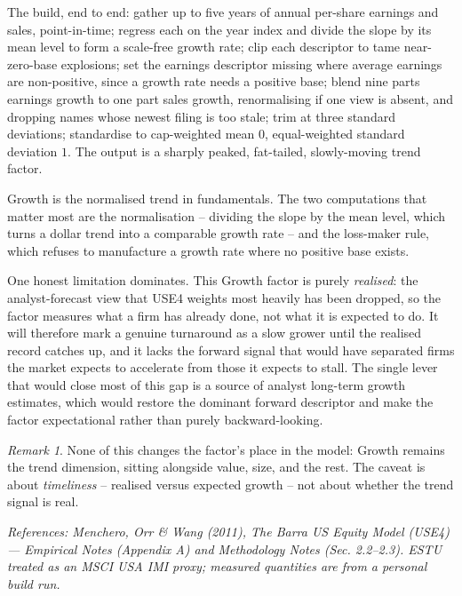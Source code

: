 \documentclass[11pt]{article}
\theoremstyle{definition}
\theoremstyle{plain}
\theoremstyle{remark}
\newtheorem*{remark}{Remark}
\begin{document}
The build, end to end: gather up to five years of annual per-share earnings and sales, point-in-time; regress each on the year index and divide the slope by its mean level to form a scale-free growth rate; clip each descriptor to tame near-zero-base explosions; set the earnings descriptor missing where average earnings are non-positive, since a growth rate needs a positive base; blend nine parts earnings growth to one part sales growth, renormalising if one view is absent, and dropping names whose newest filing is too stale; trim at three standard deviations; standardise to cap-weighted mean $0$, equal-weighted standard deviation $1$. The output is a sharply peaked, fat-tailed, slowly-moving trend factor.

\begin{keyresult}
Growth is the normalised trend in fundamentals. The two computations that matter most are the normalisation -- dividing the slope by the mean level, which turns a dollar trend into a comparable growth rate -- and the loss-maker rule, which refuses to manufacture a growth rate where no positive base exists.
\end{keyresult}

\begin{pitfall}
One honest limitation dominates. This Growth factor is purely \emph{realised}: the analyst-forecast view that USE4 weights most heavily has been dropped, so the factor measures what a firm has already done, not what it is expected to do. It will therefore mark a genuine turnaround as a slow grower until the realised record catches up, and it lacks the forward signal that would have separated firms the market expects to accelerate from those it expects to stall. The single lever that would close most of this gap is a source of analyst long-term growth estimates, which would restore the dominant forward descriptor and make the factor expectational rather than purely backward-looking.
\end{pitfall}

\begin{remark}
None of this changes the factor's place in the model: Growth remains the trend dimension, sitting alongside value, size, and the rest. The caveat is about \emph{timeliness} -- realised versus expected growth -- not about whether the trend signal is real.
\end{remark}

\begin{center}\small\itshape
References: Menchero, Orr \& Wang (2011), \textit{The Barra US Equity Model (USE4)} --- Empirical Notes (Appendix A) and Methodology Notes (Sec. 2.2--2.3). ESTU treated as an MSCI USA IMI proxy; measured quantities are from a personal build run.
\end{center}
\end{document}
